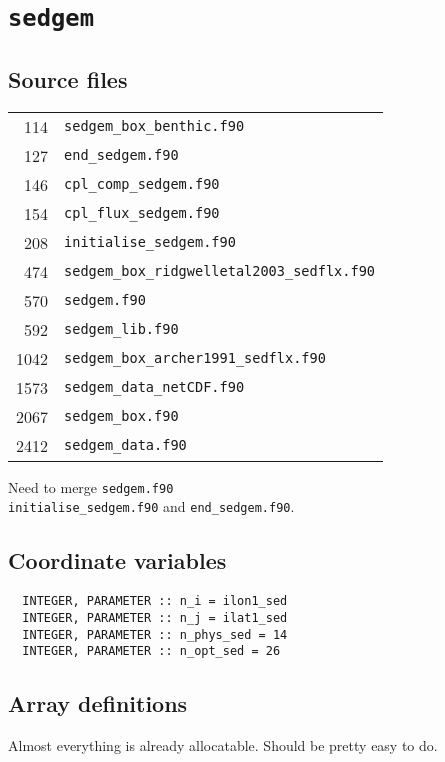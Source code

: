 \documentclass[a4paper,10pt,article]{memoir}
\begin{document}
\chapter{\texttt{sedgem}}

\section{Source files}

\begin{tabular}{rl}
 114 & \texttt{sedgem\_box\_benthic.f90} \\
 127 & \texttt{end\_sedgem.f90} \\
 146 & \texttt{cpl\_comp\_sedgem.f90} \\
 154 & \texttt{cpl\_flux\_sedgem.f90} \\
 208 & \texttt{initialise\_sedgem.f90} \\
 474 & \texttt{sedgem\_box\_ridgwelletal2003\_sedflx.f90} \\
 570 & \texttt{sedgem.f90} \\
 592 & \texttt{sedgem\_lib.f90} \\
1042 & \texttt{sedgem\_box\_archer1991\_sedflx.f90} \\
1573 & \texttt{sedgem\_data\_netCDF.f90} \\
2067 & \texttt{sedgem\_box.f90} \\
2412 & \texttt{sedgem\_data.f90} \\
\end{tabular}

Need to merge \texttt{sedgem.f90} \\ \texttt{initialise\_sedgem.f90}
and \texttt{end\_sedgem.f90}.

\section{Coordinate variables}

\begin{verbatim}
  INTEGER, PARAMETER :: n_i = ilon1_sed
  INTEGER, PARAMETER :: n_j = ilat1_sed
  INTEGER, PARAMETER :: n_phys_sed = 14
  INTEGER, PARAMETER :: n_opt_sed = 26
\end{verbatim}

\section{Array definitions}

Almost everything is already allocatable.  Should be pretty easy to
do.
\end{document}
